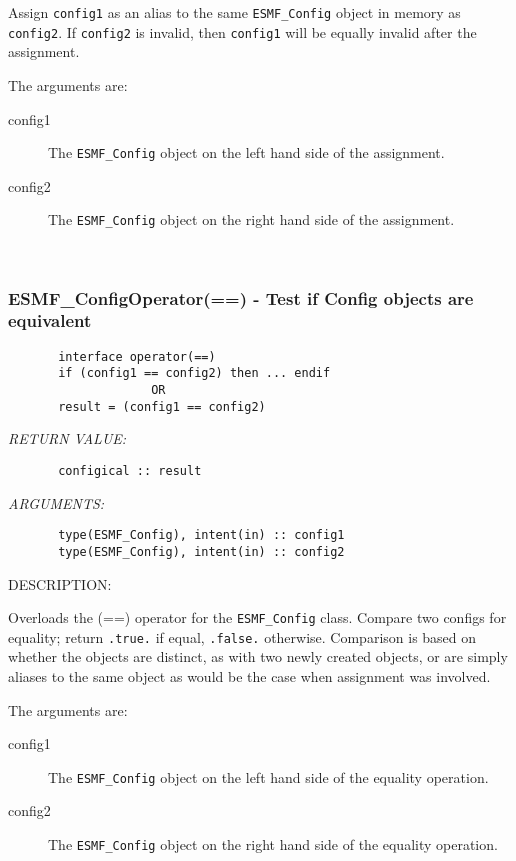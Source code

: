      Assign {\tt config1} as an alias to the same {\tt ESMF\_Config} object in memory
     as {\tt config2}. If {\tt config2} is invalid, then {\tt config1} will be
     equally invalid after the assignment.
  
     The arguments are:
     \begin{description}
     \item[config1]
       The {\tt ESMF\_Config} object on the left hand side of the assignment.
     \item[config2]
       The {\tt ESMF\_Config} object on the right hand side of the assignment.
     \end{description}
   
 
\mbox{}\hrulefill\ 
 
\subsubsection [ESMF\_ConfigOperator(==)] {ESMF\_ConfigOperator(==) - Test if Config objects are equivalent}


  
\begin{verbatim}       interface operator(==)
       if (config1 == config2) then ... endif
                    OR
       result = (config1 == config2)\end{verbatim}{\em RETURN VALUE:}
\begin{verbatim}       configical :: result\end{verbatim}{\em ARGUMENTS:}
\begin{verbatim}       type(ESMF_Config), intent(in) :: config1
       type(ESMF_Config), intent(in) :: config2\end{verbatim}
{\sf DESCRIPTION:\\ }


       Overloads the (==) operator for the {\tt ESMF\_Config} class.
       Compare two configs for equality; return {\tt .true.} if equal,
       {\tt .false.} otherwise. Comparison is based on whether the objects
       are distinct, as with two newly created objects, or are simply aliases
       to the same object as would be the case when assignment was involved.
  
       The arguments are:
       \begin{description}
       \item[config1]
            The {\tt ESMF\_Config} object on the left hand side of the equality
            operation.
       \item[config2]
            The {\tt ESMF\_Config} object on the right hand side of the equality
            operation.
       \end{description}
   
